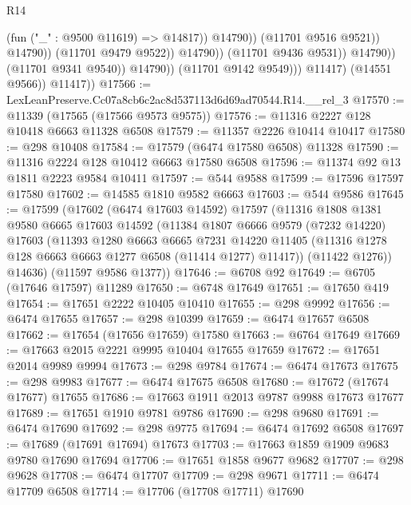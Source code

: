 \begin{lexlean}{R14}
\begin{coremodule}
                                              (fun ("_" : @9500 @11619) => @14817))
                                            @14790))
                                        (@11701 @9516 @9521))
                                      @14790))
                                  (@11701 @9479 @9522))
                                @14790))
                            (@11701 @9436 @9531))
                          @14790))
                      (@11701 @9341 @9540))
                    @14790))
                (@11701 @9142 @9549)))
            @11417)
          (@14551 @9566))
        @11417))
@17566 := LexLeanPreserve.Cc07a8cb6c2ac8d537113d6d69ad70544.R14.__rel_3
@17570 := @11339 (@17565 (@17566 @9573 @9575))
@17576 := @11316 @2227 @128 @10418 @6663 @11328 @6508
@17579 := @11357 @2226 @10414 @10417
@17580 := @298 @10408
@17584 := @17579 (@6474 @17580 @6508) @11328
@17590 := @11316 @2224 @128 @10412 @6663 @17580 @6508
@17596 := @11374 @92 @13 @1811 @2223 @9584 @10411
@17597 := @544 @9588
@17599 := @17596 @17597 @17580
@17602 := @14585 @1810 @9582 @6663
@17603 := @544 @9586
@17645 := @17599
    (@17602
      (@6474 @17603 @14592)
      @17597
      (@11316
        @1808
        @1381
        @9580
        @6665
        @17603
        @14592
        (@11384
          @1807
          @6666
          @9579
          (@7232 @14220)
          @17603
          (@11393
            @1280
            @6663
            @6665
            @7231
            @14220
            @11405
            (@11316 @1278 @128 @6663 @6663 @1277 @6508 (@11414 @1277) @11417))
          (@11422 @1276))
        @14636)
      (@11597 @9586 @1377))
@17646 := @6708 @92
@17649 := @6705 (@17646 @17597) @11289
@17650 := @6748 @17649
@17651 := @17650 @419
@17654 := @17651 @2222 @10405 @10410
@17655 := @298 @9992
@17656 := @6474 @17655
@17657 := @298 @10399
@17659 := @6474 @17657 @6508
@17662 := @17654 (@17656 @17659) @17580
@17663 := @6764 @17649
@17669 := @17663 @2015 @2221 @9995 @10404 @17655 @17659
@17672 := @17651 @2014 @9989 @9994
@17673 := @298 @9784
@17674 := @6474 @17673
@17675 := @298 @9983
@17677 := @6474 @17675 @6508
@17680 := @17672 (@17674 @17677) @17655
@17686 := @17663 @1911 @2013 @9787 @9988 @17673 @17677
@17689 := @17651 @1910 @9781 @9786
@17690 := @298 @9680
@17691 := @6474 @17690
@17692 := @298 @9775
@17694 := @6474 @17692 @6508
@17697 := @17689 (@17691 @17694) @17673
@17703 := @17663 @1859 @1909 @9683 @9780 @17690 @17694
@17706 := @17651 @1858 @9677 @9682
@17707 := @298 @9628
@17708 := @6474 @17707
@17709 := @298 @9671
@17711 := @6474 @17709 @6508
@17714 := @17706 (@17708 @17711) @17690

\end{coremodule}
\end{lexlean}
